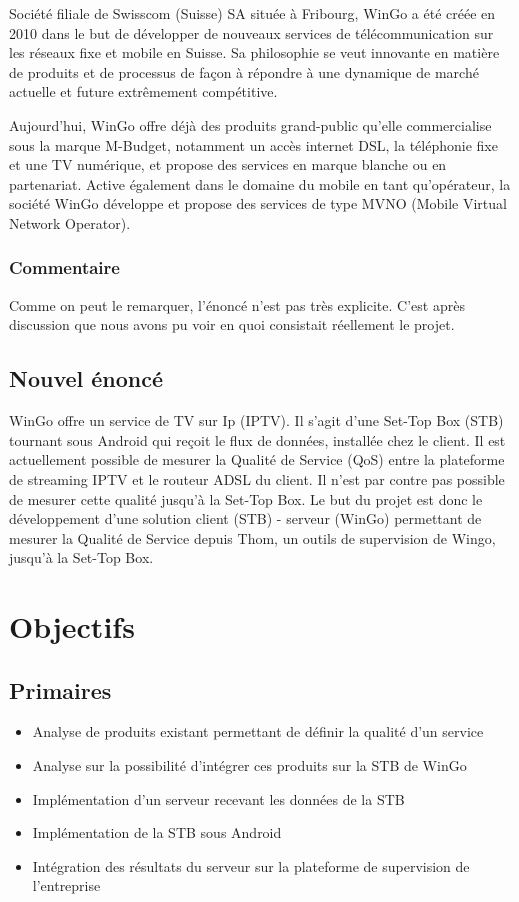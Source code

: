 \documentclass[a4paper, 12pt, svgnames]{report}
\begin{document}
	Société filiale de Swisscom (Suisse) SA située à Fribourg, WinGo a été créée en 2010 dans le but de développer de nouveaux services de télécommunication sur les réseaux fixe et mobile en Suisse. 
Sa philosophie se veut innovante en matière de produits et de processus de façon à répondre à une dynamique de marché actuelle et future extrêmement compétitive.

Aujourd'hui, WinGo offre déjà des produits grand-public qu'elle commercialise sous la marque M-Budget, notamment un accès internet DSL, la téléphonie fixe et une TV numérique, et propose des services en marque blanche ou en partenariat. Active également dans le domaine du mobile en tant qu'opérateur, la société WinGo développe et propose des services de type MVNO (Mobile Virtual 
Network Operator).
\subsubsection{Commentaire}
Comme on peut le remarquer, l'énoncé n'est pas très explicite. C'est après discussion que nous avons pu voir en quoi consistait réellement le projet.
\subsection{Nouvel énoncé}
WinGo offre un service de TV sur Ip (IPTV). Il s'agit d'une Set-Top Box (STB) tournant sous Android qui reçoit le flux de données, installée chez le client. Il est actuellement possible de mesurer la Qualité de Service (QoS) entre la plateforme de streaming IPTV et le routeur ADSL du client. Il n'est par contre pas possible de mesurer cette qualité jusqu'à la Set-Top Box. Le but du projet est donc le développement d'une solution client (STB) - serveur (WinGo) permettant de mesurer la Qualité de Service depuis Thom, un outils de supervision de Wingo, jusqu'à la Set-Top Box.
\section{Objectifs}
\subsection{Primaires}
\begin{itemize}
	\item Analyse de produits existant permettant de définir la qualité d'un service
	\item Analyse sur la possibilité d'intégrer ces produits sur la STB de WinGo
	\item Implémentation d'un serveur recevant les données de la STB
	\item Implémentation de la STB sous Android
	\item Intégration des résultats du serveur sur la plateforme de supervision de l'entreprise
\end{itemize}
\end{document}
